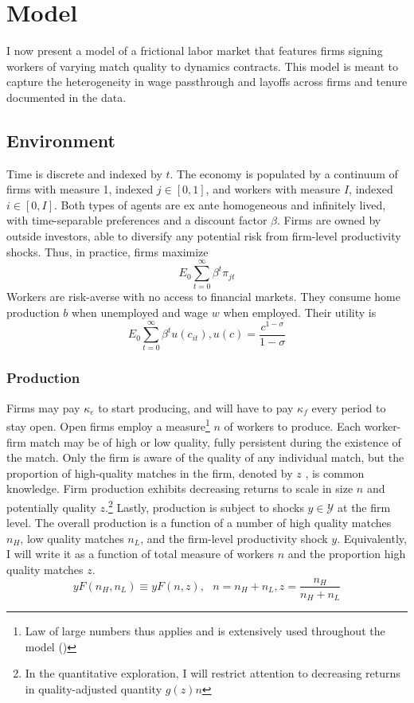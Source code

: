 \section{Model}
I now present a model of a frictional labor market that features firms signing workers of varying match quality to dynamics contracts. This model is meant to capture the heterogeneity in wage passthrough and layoffs across firms and tenure documented in the data.
\subsection{Environment} %
Time is discrete and indexed by $t$. The economy is populated by a continuum of firms with measure 1, indexed $j \in [0,1]$, and workers with measure $I$, indexed $i \in [0,I]$. Both types of agents are ex ante homogeneous and infinitely lived, with time-separable preferences and a discount factor $\beta$. Firms are owned by outside investors, able to diversify any potential risk from firm-level productivity shocks. Thus, in practice, firms maximize
\[E_0 \sum_{t=0}^\infty \beta^t \pi_{jt}\]
Workers are risk-averse with no access to financial markets. They consume home production $b$ when unemployed and wage $w$ when employed. Their utility is
\[E_0 \sum_{t=0}^\infty \beta^t u(c_{it}), u(c) = \frac{c^{1-\sigma}}{1-\sigma}\]
\subsubsection*{Production}
Firms may pay $\kappa_e$ to start producing, and will have to pay $\kappa_f$ every period to stay open.
Open firms employ a measure\footnote{Law of large numbers thus applies and is extensively used throughout the model (\textcite{Sun2009})} $n$ of workers to produce. Each worker-firm match may be of high or low quality, fully persistent during the existence of the match. Only the firm is aware of the quality of any individual match, but the proportion of high-quality matches in the firm, denoted by $z$ , is common knowledge. Firm production exhibits decreasing returns to scale in size $n$ and potentially quality $z$.\footnote{In the quantitative exploration, I will restrict attention to decreasing returns in quality-adjusted quantity $g(z)n$} Lastly, production is subject to shocks $y\in \mathcal{Y}$ at the firm level. The overall production is a function of a number of high quality matches $n_H$, low quality matches $n_L$, and the firm-level productivity shock $y$. Equivalently, I will write it as a function of total measure of workers $n$ and the proportion high quality matches $z$. %
\[yF(n_H,n_L) \equiv yF(n,z),\:\:\: n=n_H+n_L,z=\frac{n_H}{n_H+n_L}\]

